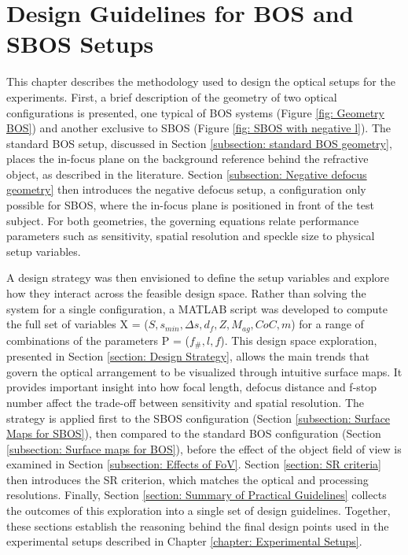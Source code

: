 \chapter{Design Guidelines for BOS and SBOS Setups}
\label{chapter: methodology}

\par This chapter describes the methodology used to design the optical setups for the experiments. First, a brief description of the geometry of two optical configurations is presented, one typical of BOS systems (Figure \ref{fig: Geometry BOS}) and another exclusive to SBOS (Figure \ref{fig: SBOS with negative l}). The standard BOS setup, discussed in Section \ref{subsection: standard BOS geometry}, places the in-focus plane on the background reference behind the refractive object, as described in the literature. Section \ref{subsection: Negative defocus geometry} then introduces the negative defocus setup, a configuration only possible for SBOS, where the in-focus plane is positioned in front of the test subject. For both geometries, the governing equations relate performance parameters such as sensitivity, spatial resolution and speckle size to physical setup variables.

\par A design strategy was then envisioned to define the setup variables and explore how they interact across the feasible design space. Rather than solving the system for a single configuration, a MATLAB script was developed to compute the full set of variables X = ($S, s_{min}, \Delta s, d_f, Z, M_{ag}, CoC, m$) for a range of combinations of the parameters P = ($f_\#, l, f$). This design space exploration, presented in Section \ref{section: Design Strategy}, allows the main trends that govern the optical arrangement to be visualized through intuitive surface maps. It provides important insight into how focal length, defocus distance and f-stop number affect the trade-off between sensitivity and spatial resolution. The strategy is applied first to the SBOS configuration (Section \ref{subsection: Surface Maps for SBOS}), then compared to the standard BOS configuration (Section \ref{subsection: Surface maps for BOS}), before the effect of the object field of view is examined in Section \ref{subsection: Effects of FoV}. Section \ref{section: SR criteria} then introduces the SR criterion, which matches the optical and processing resolutions. Finally, Section \ref{section: Summary of Practical Guidelines} collects the outcomes of this exploration into a single set of design guidelines. Together, these sections establish the reasoning behind the final design points used in the experimental setups described in Chapter \ref{chapter: Experimental Setups}.

